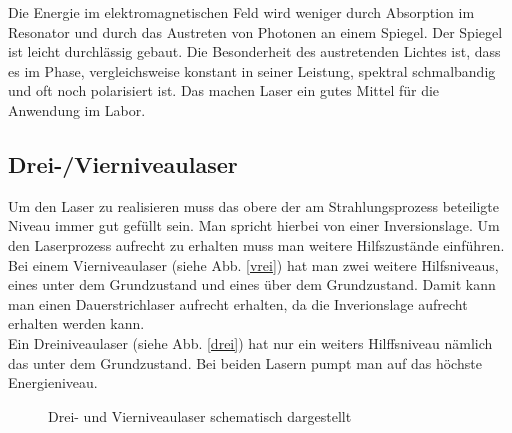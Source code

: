 Die Energie im elektromagnetischen Feld wird weniger durch Absorption im Resonator und durch das Austreten von Photonen an einem Spiegel.
Der Spiegel ist leicht durchlässig gebaut. Die Besonderheit des austretenden Lichtes ist, dass es im Phase,  vergleichsweise konstant in seiner Leistung, spektral 
schmalbandig und oft noch polarisiert ist. Das machen Laser ein gutes Mittel für die Anwendung im Labor. 

\clearpage
\subsection{Drei-/Vierniveaulaser}

Um den Laser zu realisieren muss das obere der am Strahlungsprozess beteiligte Niveau immer gut gefüllt sein. Man spricht
hierbei von einer Inversionslage. Um den Laserprozess aufrecht zu erhalten muss man weitere Hilfszustände
einführen. Bei einem Vierniveaulaser (siehe Abb. \ref{vrei}) hat man zwei weitere Hilfsniveaus, eines unter dem Grundzustand und eines über dem Grundzustand. 
Damit kann man einen Dauerstrichlaser aufrecht erhalten, da die Inverionslage aufrecht erhalten werden kann. \\
Ein Dreiniveaulaser (siehe Abb. \ref{drei}) hat nur ein weiters Hilffsniveau nämlich das unter dem Grundzustand. Bei beiden Lasern pumpt man auf
das höchste Energieniveau. 

\begin{figure}[ht]
    \centering
    \quad
      \caption{Drei- und Vierniveaulaser schematisch dargestellt \protect \footnotemark}
      \label{bild:LaserNiveaus}
\end{figure}

